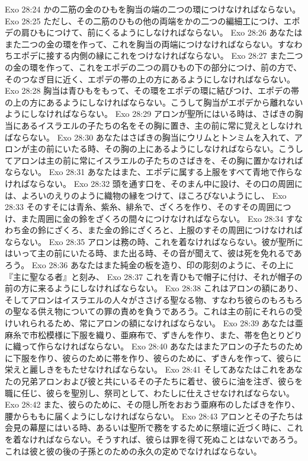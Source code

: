 Exo 28:24  かの二筋の金のひもを胸当の端の二つの環につけなければならない。
Exo 28:25  ただし、その二筋のひもの他の両端をかの二つの編細工につけ、エポデの肩ひもにつけて、前にくるようにしなければならない。
Exo 28:26  あなたはまた二つの金の環を作って、これを胸当の両端につけなければならない。すなわちエポデに接する内側の縁にこれをつけなければならない。
Exo 28:27  また二つの金の環を作って、これをエポデの二つの肩ひもの下の部分につけ、前の方で、そのつなぎ目に近く、エポデの帯の上の方にあるようにしなければならない。
Exo 28:28  胸当は青ひもをもって、その環をエポデの環に結びつけ、エポデの帯の上の方にあるようにしなければならない。こうして胸当がエポデから離れないようにしなければならない。
Exo 28:29  アロンが聖所にはいる時は、さばきの胸当にあるイスラエルの子たちの名をその胸に置き、主の前に常に覚えとしなければならない。
Exo 28:30  あなたはさばきの胸当にウリムとトンミムを入れて、アロンが主の前にいたる時、その胸の上にあるようにしなければならない。こうしてアロンは主の前に常にイスラエルの子たちのさばきを、その胸に置かなければならない。
Exo 28:31  あなたはまた、エポデに属する上服をすべて青地で作らなければならない。
Exo 28:32  頭を通す口を、そのまん中に設け、その口の周囲には、よろいのえりのように織物の縁をつけて、ほころびないようにし、
Exo 28:33  そのすそには青糸、紫糸、緋糸で、ざくろを作り、そのすその周囲につけ、また周囲に金の鈴をざくろの間々につけなければならない。
Exo 28:34  すなわち金の鈴にざくろ、また金の鈴にざくろと、上服のすその周囲につけなければならない。
Exo 28:35  アロンは務の時、これを着なければならない。彼が聖所にはいって主の前にいたる時、また出る時、その音が聞えて、彼は死を免れるであろう。
Exo 28:36  あなたはまた純金の板を造り、印の彫刻のように、その上に『主に聖なる者』と刻み、
Exo 28:37  これを青ひもで帽子に付け、それが帽子の前の方に来るようにしなければならない。
Exo 28:38  これはアロンの額にあり、そしてアロンはイスラエルの人々がささげる聖なる物、すなわち彼らのもろもろの聖なる供え物についての罪の責めを負うであろう。これは主の前にそれらの受けいれられるため、常にアロンの額になければならない。
Exo 28:39  あなたは亜麻糸で市松模様に下服を織り、亜麻布で、ずきんを作り、また、帯を色とりどりに織って作らなければならない。
Exo 28:40  あなたはまたアロンの子たちのために下服を作り、彼らのために帯を作り、彼らのために、ずきんを作って、彼らに栄えと麗しきをもたせなければならない。
Exo 28:41  そしてあなたはこれをあなたの兄弟アロンおよび彼と共にいるその子たちに着せ、彼らに油を注ぎ、彼らを職に任じ、彼らを聖別し、祭司として、わたしに仕えさせなければならない。
Exo 28:42  また、彼らのために、その隠し所をおおう亜麻布のしたばきを作り、腰からももに届くようにしなければならない。
Exo 28:43  アロンとその子たちは会見の幕屋にはいる時、あるいは聖所で務をするために祭壇に近づく時に、これを着なければならない。そうすれば、彼らは罪を得て死ぬことはないであろう。これは彼と彼の後の子孫とのための永久の定めでなければならない。
